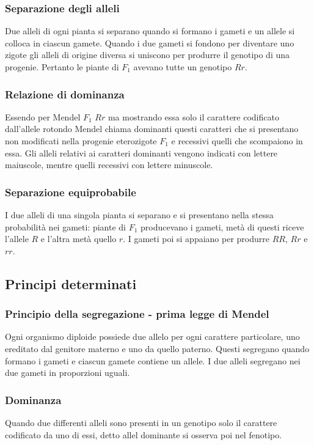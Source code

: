 \subsubsection{Separazione degli alleli}
Due alleli di ogni pianta si separano quando si formano i gameti e un allele si colloca in ciascun gamete. Quando i due gameti si fondono per diventare uno zigote gli alleli di origine diversa si 
uniscono per produrre il genotipo di una progenie. Pertanto le piante di $F_1$ avevano tutte un genotipo $Rr$. 
\subsubsection{Relazione di dominanza}
Essendo per Mendel $F_1$ $Rr$ ma mostrando essa solo il carattere codificato dall'allele rotondo Mendel chiama dominanti questi caratteri che si presentano non modificati nella progenie eterozigote $F_1$
e recessivi quelli che scompaiono in essa. Gli alleli relativi ai caratteri dominanti vengono indicati con lettere maiuscole, mentre quelli recessivi con lettere minuscole. 
\subsubsection{Separazione equiprobabile}
I due alleli di una singola pianta si separano e si presentano nella stessa probabilit\`a nei gameti: piante di $F_1$ producevano i gameti, met\`a di questi riceve l'allele $R$ e l'altra met\`a quello $r$.
I gameti poi si appaiano per produrre $RR$, $Rr$ e $rr$. 
\subsection{Principi determinati}
\subsubsection{Principio della segregazione - prima legge di Mendel}
Ogni organismo diploide possiede due allelo per ogni carattere particolare, uno ereditato dal genitore materno e uno da quello paterno. Questi segregano quando formano i gameti e ciascun gamete 
contiene un allele. I due alleli segregano nei due gameti in proporzioni uguali.
\subsubsection{Dominanza}
Quando due differenti alleli sono presenti in un genotipo solo il carattere codificato da uno di essi, detto allel dominante si osserva poi nel fenotipo. 




